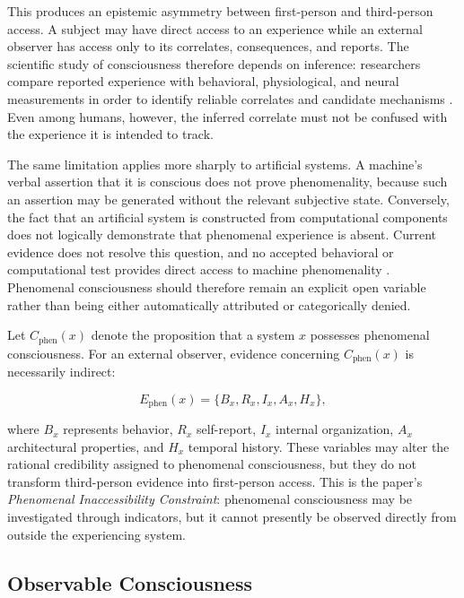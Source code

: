 This produces an epistemic asymmetry between first-person and third-person access. A subject may have direct access to an experience while an external observer has access only to its correlates, consequences, and reports. The scientific study of consciousness therefore depends on inference: researchers compare reported experience with behavioral, physiological, and neural measurements in order to identify reliable correlates and candidate mechanisms \cite{koch2016neural,seth2022theories}. Even among humans, however, the inferred correlate must not be confused with the experience it is intended to track.

The same limitation applies more sharply to artificial systems. A machine's verbal assertion that it is conscious does not prove phenomenality, because such an assertion may be generated without the relevant subjective state. Conversely, the fact that an artificial system is constructed from computational components does not logically demonstrate that phenomenal experience is absent. Current evidence does not resolve this question, and no accepted behavioral or computational test provides direct access to machine phenomenality \cite{chalmers2023llm,butlin2023consciousness}. Phenomenal consciousness should therefore remain an explicit open variable rather than being either automatically attributed or categorically denied.

Let $C_{\mathrm{phen}}(x)$ denote the proposition that a system $x$ possesses phenomenal consciousness. For an external observer, evidence concerning $C_{\mathrm{phen}}(x)$ is necessarily indirect:

\begin{equation}
E_{\mathrm{phen}}(x)
=
\{B_x, R_x, I_x, A_x, H_x\},
\label{eq:phenomenal-evidence}
\end{equation}

where $B_x$ represents behavior, $R_x$ self-report, $I_x$ internal organization, $A_x$ architectural properties, and $H_x$ temporal history. These variables may alter the rational credibility assigned to phenomenal consciousness, but they do not transform third-person evidence into first-person access. This is the paper's \emph{Phenomenal Inaccessibility Constraint}: phenomenal consciousness may be investigated through indicators, but it cannot presently be observed directly from outside the experiencing system.

\subsection{Observable Consciousness}
\label{subsec:observable-consciousness}


